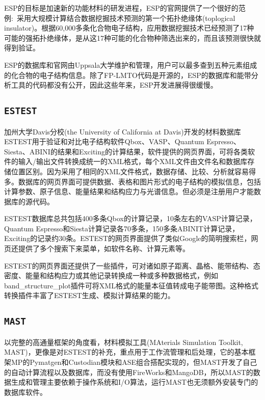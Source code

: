 \textrm{ESP}的目标是加速新的功能材料的研发进程，\textrm{ESP}的官网提供了一个很好的范例:~采用大规模计算结合数据挖掘技术预测的第一个拓扑绝缘体\textrm{(toplogical insulator)}。根据60,000多条化合物电子结构，应用数据挖掘技术已经预测了17种可能的强拓扑绝缘体\cite{arXiv1007-4838_2010,APR6-31_2014}，是从这17种可能的化合物种筛选出来的，而且该预测很快就得到验证。

\textrm{ESP}的数据库和官网由\textrm{Uppsala}大学维护和管理，用户可以最多查到五种元素组成的化合物的电子结构信息。除了\textrm{FP-LMTO}代码是开源的，\textrm{ESP}的数据库和能带分析工具的代码都没有公开，因此这些年来，\textrm{ESP}开发进展得很缓慢。

\subsection{\tt{ESTEST}}
加州大学\textrm{Davis}分校\textrm{(the University of California at Davis)}开发的材料数据库\textrm{ESTEST}\cite{ESTEST_URL,CSD3-015004_2010,CPC183-1744_2010}用于验证和对比电子结构软件\textrm{Qbox}、\textrm{VASP}、\textrm{Quantum Espresso}、\textrm{Siesta}、\textrm{ABINI}的结果和\textrm{Exciting}的计算结果，软件提供的网页界面，可将各类软件的输入/输出文件转换成统一的\textrm{XML}格式，每个\textrm{XML}文件由文件名和数据库存储位置区别。因为采用了相同的\textrm{XML}文件格式，数据存储、比较、分析就容易得多。数据库的网页界面可提供数据、表格和图片形式的电子结构的模拟信息，包括计算参数、原子信息、能量结果和结构应力与光谱信息。但必须是注册用户才能数据库的源代码。

\textrm{ESTEST}数据库总共包括400多条\textrm{Qbox}的计算记录，10条左右的\textrm{VASP}计算记录，\textrm{Quantum Espresso}和\textrm{Siesta}计算记录各70多条，150多条\textrm{ABINIT}计算记录，\textrm{Exciting}的记录约30条。\textrm{ESTEST}的网页界面提供了类似\textrm{Google}的简明搜索栏，网页还提供了多个搜索下来菜单，如软件名称、计算元素等。

\textrm{ESTEST}的网页界面还提供了一些插件，可对诸如原子距离、晶格、能带结构、态密度、能量和结构应力或其他记录转换成一种或多种数据格式，例如\textrm{band\_structure\_plot}插件可将\textrm{XML}格式的能量本征值转成电子能带图。这种格式转换插件丰富了\textrm{ESTEST}生成、模拟计算结果的能力。

\subsection{\tt{MAST}}
以完整的高通量框架的角度看，材料模拟工具\textrm{(MAterials Simulation Toolkit, MAST)}，更像是对\textrm{ESTEST}的补充，重点用于工作流管理和后处理\cite{MAST_URL}，它的基本框架\textrm{MP}的\textrm{Pymatgen}和\textrm{Custodian}模块和\textrm{ASE}组合搭配实现的，但\textrm{MAST}开发了自己的自动计算流程以及数据库，而没有使用\textrm{FireWorks}和\textrm{MangoDB}，所以\textrm{MAST}的数据生成和管理主要依赖于操作系统和\textrm{I/O}算法，运行\textrm{MAST}也无须额外安装专门的数据库软件。

